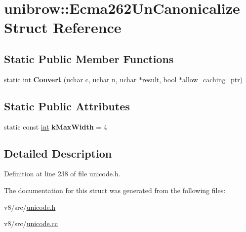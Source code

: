 \hypertarget{structunibrow_1_1Ecma262UnCanonicalize}{}\section{unibrow\+:\+:Ecma262\+Un\+Canonicalize Struct Reference}
\label{structunibrow_1_1Ecma262UnCanonicalize}
\subsection*{Static Public Member Functions}
\begin{DoxyCompactItemize}
\item 
\mbox{\label{structunibrow_1_1Ecma262UnCanonicalize_a1740c097b65e6f7d1f191460d140b8b0}} 
static \mbox{\hyperlink{classint}{int}} {\bfseries Convert} (uchar c, uchar n, uchar $\ast$result, \mbox{\hyperlink{classbool}{bool}} $\ast$allow\+\_\+caching\+\_\+ptr)
\end{DoxyCompactItemize}
\subsection*{Static Public Attributes}
\begin{DoxyCompactItemize}
\item 
\mbox{\label{structunibrow_1_1Ecma262UnCanonicalize_a3c53472528136e8a9e0d10ac29ee2456}} 
static const \mbox{\hyperlink{classint}{int}} {\bfseries k\+Max\+Width} = 4
\end{DoxyCompactItemize}


\subsection{Detailed Description}


Definition at line 238 of file unicode.\+h.



The documentation for this struct was generated from the following files\+:\begin{DoxyCompactItemize}
\item 
v8/src/\mbox{\hyperlink{unicode_8h}{unicode.\+h}}\item 
v8/src/\mbox{\hyperlink{unicode_8cc}{unicode.\+cc}}\end{DoxyCompactItemize}
